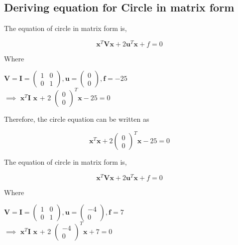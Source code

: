 \documentclass[journal,12pt,twocolumn]{article}
\let\vec\mathbf
\newcommand{\myvec}[1]{\ensuremath{\begin{pmatrix}#1\end{pmatrix}}}
\begin{document}
\subsection{Deriving equation for Circle in matrix form}
\vspace{0.2cm}
\begin{flushleft}
The equation of circle in matrix form is,\\
\vspace{0.25cm}
\end{flushleft}
\vspace{0.25cm}
\begin{equation}
 \vec{x}^T \vec{V} \vec{x} + 2 \vec{u}^T \vec{x} + f = 0
\end{equation}
\begin{flushleft}
Where\\
\end{flushleft}
\center
$\vec{V} = \vec{I}= \myvec{ 1 & 0\\ 0 & 1} , \vec{u} = \myvec{0 \\ 0}, \vec{f}=-25$\\
\endcenter
\center
  $\implies$  $ \vec{x}^T$$\vec{I}$ $\vec{x}$  + 2 $ \myvec{0\\0}^T \vec{x} -25 = 0$
\endcenter
\begin{flushleft}
\vspace{0.23cm}
Therefore, the circle equation can be written as
\end{flushleft}
\begin{equation}
    \vec{x}^T \vec{x} + 2 \myvec{0\\0}^T \vec{x} -25= 0
\end{equation}
\endcenter
\begin{flushleft}
The equation of circle in matrix form is,\\
\vspace{0.25cm}
\end{flushleft}
\vspace{0.25cm}
\begin{equation}
 \vec{x}^T \vec{V} \vec{x} + 2 \vec{u}^T \vec{x} + f = 0
\end{equation}
\begin{flushleft}
Where\\
\end{flushleft}
\center
$\vec{V} = \vec{I}= \myvec{ 1 & 0\\ 0 & 1} , \vec{u} = \myvec{-4 \\ 0}, \vec{f}=7$\\  \vspace{10mm}
\endcenter
\center
  $\implies$  $ \vec{x}^T$$\vec{I}$ $\vec{x}$  + 2 $ \myvec{-4\\0}^T \vec{x} +7= 0$
\end{document}
